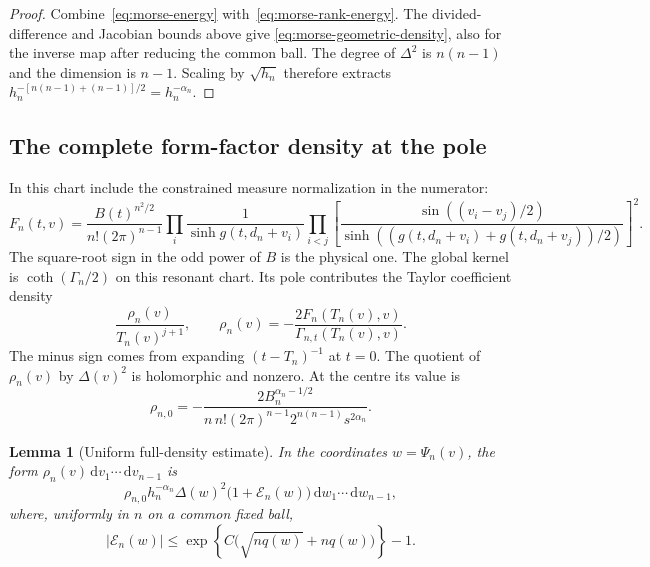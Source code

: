 \documentclass[11pt]{article}
\numberwithin{equation}{section}
\newtheorem{lemma}[theorem]{Lemma}
\theoremstyle{definition}
\newcommand{\dd}{\,\mathrm d}
\begin{document}
\begin{proof}
Combine~\eqref{eq:morse-energy} with~\eqref{eq:morse-rank-energy}.
The divided-difference and Jacobian bounds above give
\eqref{eq:morse-geometric-density}, also for the inverse map after
reducing the common ball.  The degree of $\Delta^2$ is $n(n-1)$ and
the dimension is $n-1$.  Scaling by $\sqrt{h_n}$ therefore extracts
$h_n^{-[n(n-1)+(n-1)]/2}=h_n^{-\alpha_n}$.
\end{proof}

\subsection{The complete form-factor density at the pole}

In this chart include the constrained measure normalization in the
numerator:
\begin{equation}
 F_n(t,v)=\frac{B(t)^{n^2/2}}{n!(2\pi)^{n-1}}
 \prod_i\frac1{\sinh g(t,d_n+v_i)}
 \prod_{i<j}\left[
 \frac{\sin((v_i-v_j)/2)}
 {\sinh((g(t,d_n+v_i)+g(t,d_n+v_j))/2)}\right]^2.
 \label{eq:morse-complete-numerator}
\end{equation}
The square-root sign in the odd power of $B$ is the physical one.
The global kernel is $\coth(\Gamma_n/2)$ on this resonant chart.
Its pole contributes the Taylor coefficient density
\begin{equation}
 \frac{\rho_n(v)}{T_n(v)^{j+1}},\qquad
 \rho_n(v)=-\frac{2F_n(T_n(v),v)}
 {\Gamma_{n,t}(T_n(v),v)}.
 \label{eq:morse-residue-density}
\end{equation}
The minus sign comes from expanding $(t-T_n)^{-1}$ at $t=0$.
The quotient of $\rho_n(v)$ by $\Delta(v)^2$ is holomorphic and
nonzero.  At the centre its value is
\begin{equation}
 \rho_{n,0}=-\frac{2B_n^{\alpha_n-1/2}}
 {n\,n!(2\pi)^{n-1}2^{n(n-1)}s^{2\alpha_n}}.
 \label{eq:morse-centre-density}
\end{equation}

\begin{lemma}[Uniform full-density estimate]
\label{lem:morse-density}
In the coordinates $w=\Psi_n(v)$, the form
$\rho_n(v)\dd v_1\cdots\dd v_{n-1}$ is
\begin{equation}
 \rho_{n,0}h_n^{-\alpha_n}\Delta(w)^2
 \bigl(1+\mathcal E_n(w)\bigr)
 \dd w_1\cdots\dd w_{n-1},
 \label{eq:morse-transformed-density}
\end{equation}
where, uniformly in $n$ on a common fixed ball,
\begin{equation}
 |\mathcal E_n(w)|\le
 \exp\!\left\{C\bigl(\sqrt{nq(w)}+nq(w)\bigr)\right\}-1.
 \label{eq:morse-density-error}
\end{equation}
\end{lemma}
\end{document}
